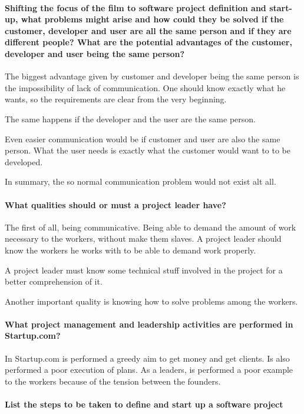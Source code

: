 \documentclass{article}
\begin{document}
\paragraph{Shifting the focus of the film to software project definition and start-up, what problems might arise and how could they be solved if the customer, developer and user are all the same person and if they are different people? What are the potential advantages of the customer, developer and user being the same person?}


The biggest advantage given by  customer and developer being the same person is the impossibility of lack of communication. One should know exactly what he wants, so the requirements are clear from the very beginning.

The same happens if the developer and the user are the same person. 

Even easier communication would be if customer and user are also the same person. What the user needs is exactly what the customer would want to to be developed.

In summary, the so normal communication problem would not exist alt all.

\paragraph{What qualities should or must a project leader have?}
The first of all, being communicative. Being able to demand the amount of work necessary to the workers, without make them slaves. A project leader should know the workers he works with to be able to demand work properly.

A project leader must know some technical stuff involved in the project for a better comprehension of it.

Another important quality is knowing how to solve problems among the workers.


\paragraph{What project management and leadership activities are performed in Startup.com?}

In Startup.com is performed a greedy aim to get money and get clients. Is also performed a poor execution of plans. As a leaders, is performed a poor example to the workers because of the tension between the founders.

\paragraph{List the steps to be taken to define and start up a software project}
\end{document}
